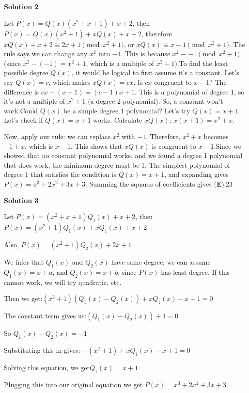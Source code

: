 \begin{enumerate}
 



\textbf{Solution 2}

Let $P(x) = Q(x)(x^2+x+1) + x + 2$, then $P(x) = Q(x)(x^2+1) + xQ(x) + x + 2$, therefore $xQ(x) + x + 2 \equiv 2x + 1 \pmod{x^2+1}$, or $xQ(x) \equiv x-1 \pmod{x^2+1}$. The rule says we can change any $x^2$ into $-1$. This is because $x^2 \equiv -1 \pmod{x^2+1}$ (since $x^2 - (-1) = x^2+1$, which is a multiple of $x^2+1$).To find the least possible degree $Q(x)$, it would be logical to first assume it's a constant. Let's say $Q(x)=c$, which makes $xQ(x) = cx$. Is $cx$ congruent to $x-1$? The difference is $cx - (x-1) = (c-1)x+1$. This is a polynomial of degree 1, so it's not a multiple of $x^2+1$ (a degree 2 polynomial). So, a constant won't work.Could $Q(x)$ be a simple degree 1 polynomial? Let's try $Q(x) = x+1$. Let's check if $Q(x) = x+1$ works. Calculate $xQ(x)$: $x(x+1) = x^2+x$. 

 Now, apply our rule: we can replace $x^2$ with $-1$. Therefore, $x^2+x$ becomes $-1+x$, which is $x-1$. This shows that $xQ(x)$ is congruent to $x-1$.Since we showed that no constant polynomial works, and we found a degree 1 polynomial that does work, the minimum degree must be 1. The simplest polynomial of degree 1 that satisfies the condition is $Q(x)=x+1$, and expanding gives $P(x) = x^3+2x^2+3x+3$. Summing the squares of coefficients gives $\boxed{\textbf{(E)} \ 23}$




\textbf{Solution 3}

Let $P(x) = (x^2+x+1)Q_1(x) + x + 2$, then $P(x) = (x^2+1)Q_1(x) + xQ_1(x) + x + 2$

 Also, $P(x) = (x^2+1)Q_2(x) + 2x + 1$

 We infer that $Q_1(x)$ and $Q_2(x)$ have same degree, we can assume $Q_1(x) = x + a$, and $Q_2(x) = x + b$, since $P(x)$ has least degree. If this cannot work, we will try quadratic, etc.

 Then we get:$(x^2+1)(Q_1(x) - Q_2(x)) + xQ_1(x) - x + 1 = 0$

 The constant term gives us:$(Q_1(x) - Q_2(x)) + 1 = 0$

 So $Q_1(x) - Q_2(x) = -1$

 Substituting this in gives: $-(x^2+1) + xQ_1(x) - x + 1 = 0$

 Solving this equation, we get$Q_1(x) = x + 1$ 

 Plugging this into our original equation we get $P(x) = x^3 + 2x^2 + 3x + 3$


\end{enumerate}
